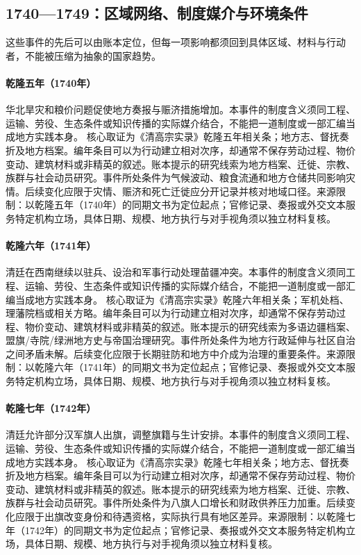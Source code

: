 \subsection{1740—1749：区域网络、制度媒介与环境条件}
这些事件的先后可以由账本定位，但每一项影响都须回到具体区域、材料与行动者，不能被压缩为抽象的国家趋势。
\hypertarget{civic:EQ-1740-NORTH-CHINA-FAMINE}{}\paragraph{乾隆五年（1740年）}华北旱灾和粮价问题促使地方奏报与赈济措施增加。本事件的制度含义须同工程、运输、劳役、生态条件或知识传播的实际媒介结合，不能把一道制度或一部汇编当成地方实践本身。 核心取证为《清高宗实录》乾隆五年相关条；地方志、督抚奏折及地方档案。编年条目可以为行动建立相对次序，却通常不保存劳动过程、物价变动、建筑材料或非精英的叙述。账本提示的研究线索为地方档案、迁徙、宗教、族群与社会动员研究。事件所处条件为气候波动、粮食流通和地方仓储共同影响灾情。后续变化应限于灾情、赈济和死亡迁徙应分开记录并核对地域口径。来源限制：以乾隆五年（1740年）的同期文书为定位起点；官修记录、奏报或外交文本服务特定机构立场，具体日期、规模、地方执行与对手视角须以独立材料复核。
\hypertarget{civic:EQ-1741-MIAO-FRONTIER-CAMPAIGN}{}\paragraph{乾隆六年（1741年）}清廷在西南继续以驻兵、设治和军事行动处理苗疆冲突。本事件的制度含义须同工程、运输、劳役、生态条件或知识传播的实际媒介结合，不能把一道制度或一部汇编当成地方实践本身。 核心取证为《清高宗实录》乾隆六年相关条；军机处档、理藩院档或相关方略。编年条目可以为行动建立相对次序，却通常不保存劳动过程、物价变动、建筑材料或非精英的叙述。账本提示的研究线索为多语边疆档案、盟旗/寺院/绿洲地方史与帝国治理研究。事件所处条件为地方行政延伸与社区自治之间矛盾未解。后续变化应限于长期驻防和地方中介成为治理的重要条件。来源限制：以乾隆六年（1741年）的同期文书为定位起点；官修记录、奏报或外交文本服务特定机构立场，具体日期、规模、地方执行与对手视角须以独立材料复核。
\hypertarget{civic:EQ-1742-BANNER-EXIT-ORDER}{}\paragraph{乾隆七年（1742年）}清廷允许部分汉军旗人出旗，调整旗籍与生计安排。本事件的制度含义须同工程、运输、劳役、生态条件或知识传播的实际媒介结合，不能把一道制度或一部汇编当成地方实践本身。 核心取证为《清高宗实录》乾隆七年相关条；地方志、督抚奏折及地方档案。编年条目可以为行动建立相对次序，却通常不保存劳动过程、物价变动、建筑材料或非精英的叙述。账本提示的研究线索为地方档案、迁徙、宗教、族群与社会动员研究。事件所处条件为八旗人口增长和财政供养压力加重。后续变化应限于出旗改变身份和待遇资格，实际执行具有地区差异。来源限制：以乾隆七年（1742年）的同期文书为定位起点；官修记录、奏报或外交文本服务特定机构立场，具体日期、规模、地方执行与对手视角须以独立材料复核。
